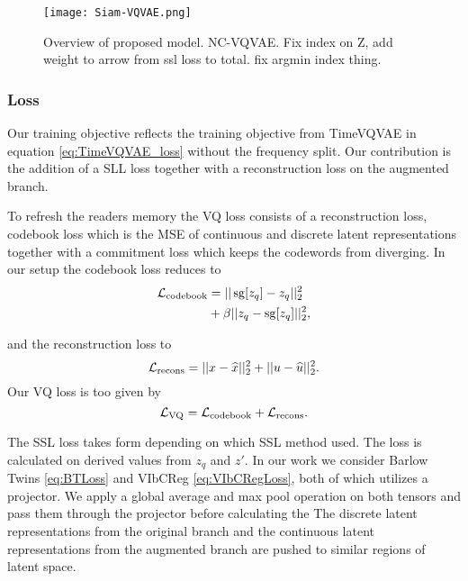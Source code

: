 \documentclass[../../thesis.tex]{subfiles}
\begin{document}
\begin{figure}[h]
    \label{fig:NCVQVAE}
    \texttt{[image: Siam-VQVAE.png]}
    \centering  
    \caption{Overview of proposed model. NC-VQVAE. Fix index on Z, add weight to arrow from ssl loss to total. fix argmin index thing.}
\end{figure}

\subsubsection{Loss}
Our training objective reflects the training objective from TimeVQVAE in equation \ref{eq:TimeVQVAE_loss} without the frequency split. Our contribution is the addition of a SLL loss together with a reconstruction loss on the augmented branch.\newline

To refresh the readers memory the VQ loss consists of a reconstruction loss, codebook loss which is the MSE of continuous and discrete latent representations together with a commitment loss which keeps the codewords from diverging. In our setup the codebook loss reduces to
\begin{equation}
    \label{eq:NCVQVAE_codebook}
    \begin{aligned}
        \mathcal{L}_\text{codebook} &= ||\operatorname{sg}[z_q] - z_q ||_2^2 \\
                              &+ \beta||z_q - \operatorname{sg}[z_q]||_2^2,
    \end{aligned}
\end{equation}

and the reconstruction loss to
\begin{equation}
    \label{eq:NCVQVAE_recons}
        \mathcal{L}_\text{recons} = ||x - \widehat{x} ||_2^2 + ||u - \widehat{u}||_2^2.
\end{equation}
\newline
Our VQ loss is too given by
\begin{equation}
    \label{eq:NCVQVAE_loss}
    \mathcal{L}_\text{VQ} = \mathcal{L}_\text{codebook} + \mathcal{L}_\text{recons}.
\end{equation}

The SSL loss takes form depending on which SSL method used. The loss is calculated on derived values from $z_q$ and $z'$. In our work we consider Barlow Twins \ref{eq:BTLoss} and VIbCReg \ref{eq:VIbCRegLoss}, both of which utilizes a projector. We apply a global average and max pool operation on both tensors and pass them through the projector before calculating the 
The discrete latent representations from the original branch and the continuous latent representations from the augmented branch are pushed to similar regions of latent space.
\newline
\end{document}
